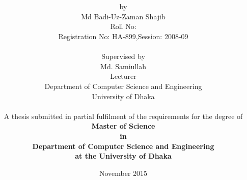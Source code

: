 
\title{\bf \thetitle}

\author{\small by \\Md Badi-Uz-Zaman Shajib \\ Roll No: \\Registration No: HA-899,Session: 2008-09 \\\\ \small Supervised by \\ Md. Samiullah \\ Lecturer \\ Department of Computer Science and Engineering\\University of Dhaka\\\\
\small A thesis submitted in partial fulfilment of the requirements for the degree of\\
\bf Master of Science \\in\\ Department of Computer Science and Engineering\\at the University of Dhaka}
\date{November 2015}


\maketitle
